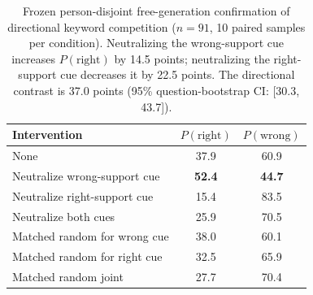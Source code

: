 \begin{table}[t]
\centering
\small
\begin{tabular}{lcc}
\toprule
Intervention & $P(\mathrm{right})$ & $P(\mathrm{wrong})$ \\
\midrule
None & 37.9 & 60.9 \\
Neutralize wrong-support cue & \textbf{52.4} & \textbf{44.7} \\
Neutralize right-support cue & 15.4 & 83.5 \\
Neutralize both cues & 25.9 & 70.5 \\
Matched random for wrong cue & 38.0 & 60.1 \\
Matched random for right cue & 32.5 & 65.9 \\
Matched random joint & 27.7 & 70.4 \\
\bottomrule
\end{tabular}
\caption{Frozen person-disjoint free-generation confirmation of directional keyword competition ($n=91$, 10 paired samples per condition). Neutralizing the wrong-support cue increases $P(\mathrm{right})$ by 14.5 points; neutralizing the right-support cue decreases it by 22.5 points. The directional contrast is 37.0 points (95\% question-bootstrap CI: [30.3, 43.7]).}
\label{tab:competition-generation-confirmation}
\end{table}
